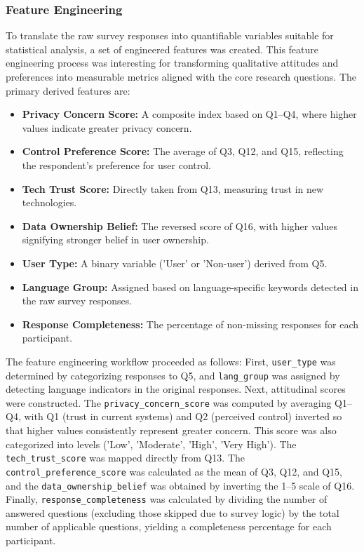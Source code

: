 	\subsubsection{Feature Engineering}
	To translate the raw survey responses into quantifiable variables suitable for statistical analysis, a set of engineered features was created. This feature engineering process was interesting for transforming qualitative attitudes and preferences into measurable metrics aligned with the core research questions. The primary derived features are:
	\begin{itemize}
		\item \textbf{Privacy Concern Score:} A composite index based on Q1--Q4, where higher values indicate greater privacy concern.
		\item \textbf{Control Preference Score:} The average of Q3, Q12, and Q15, reflecting the respondent's preference for user control.
		\item \textbf{Tech Trust Score:} Directly taken from Q13, measuring trust in new technologies.
		\item \textbf{Data Ownership Belief:} The reversed score of Q16, with higher values signifying stronger belief in user ownership.
		\item \textbf{User Type:} A binary variable ('User' or 'Non-user') derived from Q5.
		\item \textbf{Language Group:} Assigned based on language-specific keywords detected in the raw survey responses.
		\item \textbf{Response Completeness:} The percentage of non-missing responses for each participant.
	\end{itemize}
	The feature engineering workflow proceeded as follows: First, \texttt{user\_type} was determined by categorizing responses to Q5, and \texttt{lang\_group} was assigned by detecting language indicators in the original responses. 
	Next, attitudinal scores were constructed. The \texttt{privacy\_concern\_score} was computed by averaging Q1--Q4, with Q1 (trust in current systems) and Q2 (perceived control) inverted so that higher values consistently represent greater concern. This score was also categorized into levels ('Low', 'Moderate', 'High', 'Very High'). The \texttt{tech\_trust\_score} was mapped directly from Q13. The \texttt{control\_preference\_score} was calculated as the mean of Q3, Q12, and Q15, and the \texttt{data\_ownership\_belief} was obtained by inverting the 1--5 scale of Q16.
	Finally, \texttt{response\_completeness} was calculated by dividing the number of answered questions (excluding those skipped due to survey logic) by the total number of applicable questions, yielding a completeness percentage for each participant.	
